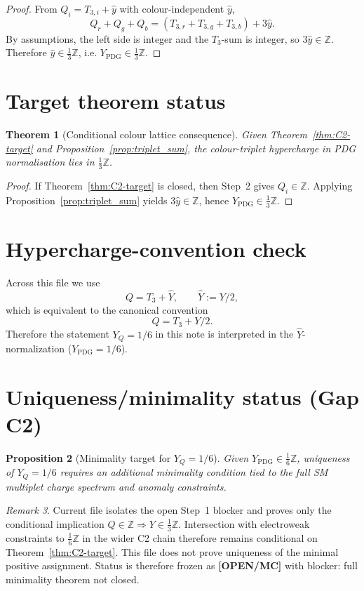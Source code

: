 \documentclass[12pt,a4paper]{article}
\newtheorem{theorem}{Theorem}[section]
\newtheorem{proposition}[theorem]{Proposition}
\theoremstyle{remark}
\newtheorem{remark}[theorem]{Remark}
\newcommand{\ZZ}{\mathbb{Z}}
\begin{document}
\begin{proof}
From \(Q_i=T_{3,i}+\widehat y\) with colour-independent \(\widehat y\),
\[
Q_r+Q_g+Q_b=(T_{3,r}+T_{3,g}+T_{3,b})+3\widehat y.
\]
By assumptions, the left side is integer and the \(T_3\)-sum is integer, so \(3\widehat y\in\ZZ\).
Therefore \(\widehat y\in\frac13\ZZ\), i.e. \(Y_{\mathrm{PDG}}\in\frac13\ZZ\).
\end{proof}

\section{Target theorem status}
\begin{theorem}[Conditional colour lattice consequence]
\label{thm:colour_lattice}
Given Theorem~\ref{thm:C2-target} and Proposition~\ref{prop:triplet_sum}, the colour-triplet
hypercharge in PDG normalisation lies in \(\frac13\ZZ\).
\end{theorem}

\begin{proof}
If Theorem~\ref{thm:C2-target} is closed, then Step~2 gives \(Q_i\in\ZZ\).
Applying Proposition~\ref{prop:triplet_sum} yields \(3\widehat y\in\ZZ\), hence
\(Y_{\mathrm{PDG}}\in\frac13\ZZ\).
\end{proof}

\section{Hypercharge-convention check}
Across this file we use
\[
Q=T_3+\widehat Y,\qquad \widehat Y:=Y/2,
\]
which is equivalent to the canonical convention
\[
Q=T_3+Y/2.
\]
Therefore the statement \(Y_Q=1/6\) in this note is interpreted in the
\(\widehat Y\)-normalization (\(Y_{\mathrm{PDG}}=1/6\)).

\section{Uniqueness/minimality status (Gap C2)}
\begin{proposition}[Minimality target for \(Y_Q=1/6\)]
Given \(Y_{\mathrm{PDG}}\in\frac16\ZZ\), uniqueness of \(Y_Q=1/6\) requires an
additional minimality condition tied to the full SM multiplet charge spectrum
and anomaly constraints.
\end{proposition}

\begin{remark}
Current file isolates the open Step~1 blocker and proves only the
conditional implication \(Q\in\ZZ \Rightarrow Y\in\frac13\ZZ\).
Intersection with electroweak constraints to \(\frac16\ZZ\) in the wider C2
chain therefore remains conditional on Theorem~\ref{thm:C2-target}.
This file does not prove uniqueness of the minimal positive assignment.
Status is therefore frozen as \textbf{[OPEN/MC]} with blocker:
full minimality theorem not closed.
\end{remark}
\end{document}
